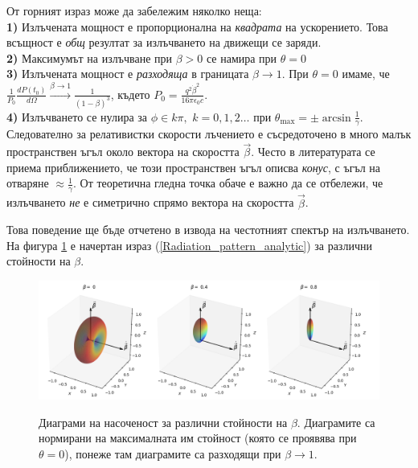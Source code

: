 \begin{appendices}
От горният израз може да забележим няколко неща:\\

\textbf{1)} Излъчената мощност е пропорционална на \emph{квадрата} на ускорението. Това всъщност е \emph{общ} резултат за излъчването на движещи се заряди.\\

\textbf{2)} Максимумът на излъчване при $\beta > 0$ се намира при $\theta = 0$\\

\textbf{3)} Излъчената мощност е \emph{разходяща} в границата $\beta\rightarrow 1$. При $\theta = 0$ имаме, че $\frac{1}{P_0}\frac{dP(t_0)}{d\Omega}\xrightarrow{\beta\rightarrow 1} \frac{1}{(1-\beta)^3}$, където $P_0 = \frac{q^2\dot{\beta}^2}{16\pi\epsilon_0 c}$.\\

\textbf{4)} Излъчването се нулира за $\phi \in k\pi,\,\, k = 0,1,2\dots$ при $\theta_{\max} = \pm \arcsin\frac{1}{\gamma}$. Следователно за релативистки скорости лъчението е съсредоточено в много малък пространствен ъгъл около вектора на скоростта $\vec{\beta}$. Често в литературата се приема приближението, че този пространствен ъгъл описва \emph{конус}, с ъгъл на отваряне $\approx \frac{1}{\gamma}$. От теоретична гледна точка обаче е важно да се отбележи, че излъчването \emph{не} е симетрично спрямо вектора на скоростта $\vec{\beta}$.


Това поведение ще бъде отчетено в извода на честотният спектър на излъчването. На фигура \ref{Radiation_patterns_3D} е начертан израз (\ref{Radiation_pattern_analytic}) за различни стойности на $\beta$.

\begin{figure}[h!]
	\centering
	\includegraphics[scale = 0.4]{Radiation_Patterns_crop.png}\\
	\caption[Диаграми на насоченост]{Диаграми на насоченост за различни стойности на $\beta$. Диаграмите са нормирани на максималната им стойност (която се проявява при $\theta = 0$), понеже там диаграмите са разходящи при $\beta\rightarrow 1$.}
	\label{Radiation_patterns_3D}
\end{figure}


\end{appendices}
